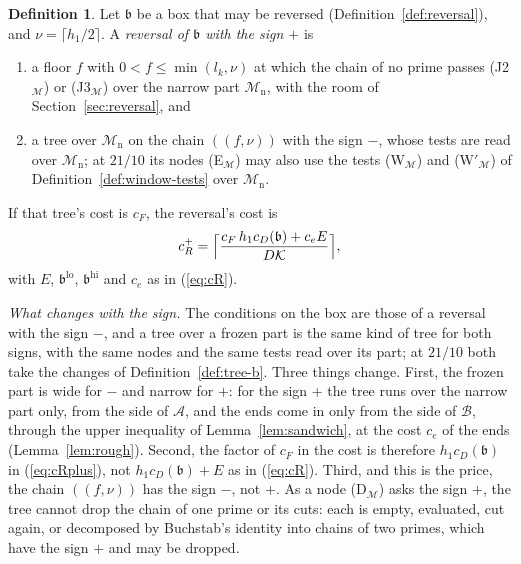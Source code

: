 \documentclass[11pt]{article}
\theoremstyle{definition}
\newtheorem{definition}[theorem]{Definition}
\begin{document}
\begin{definition}\label{def:reversal-plus}
Let $\mathfrak b$ be a box that may be reversed (Definition~\ref{def:reversal}), and $\nu = \lceil h_1/2 \rceil$. A
\emph{reversal of $\mathfrak b$ with the sign $+$} is
\begin{enumerate}
\item[(i)] a floor $f$ with $0 < f \le \min(l_k, \nu)$ at which the chain of no prime passes (J2$_{\mathcal M}$) or
  (J3$_{\mathcal M}$) over the narrow part $\mathcal M_{\mathrm n}$, with the room of Section~\ref{sec:reversal}, and
\item[(ii)] a tree over $\mathcal M_{\mathrm n}$ on the chain $((f, \nu))$ with the sign $-$, whose tests are read
  over $\mathcal M_{\mathrm n}$; at $21/10$ its nodes (E$_{\mathcal M}$) may also use the tests (W$_{\mathcal M}$) and
  (W$'_{\mathcal M}$) of Definition~\ref{def:window-tests} over $\mathcal M_{\mathrm n}$.
\end{enumerate}
If that tree's cost is $c_F$, the reversal's cost is
\begin{equation}\label{eq:cRplus}
  c_R^+ = \Bigl\lceil \frac{c_F\, h_1 c_D(\mathfrak b) + c_e E}{D\mathcal K} \Bigr\rceil,
\end{equation}
with $E$, $\mathfrak b^{\mathrm{lo}}$, $\mathfrak b^{\mathrm{hi}}$ and $c_e$ as in (\ref{eq:cR}).
\end{definition}

\emph{What changes with the sign.} The conditions on the box are those of a reversal with the sign $-$, and a tree over
a frozen part is the same kind of tree for both signs, with the same nodes and the same tests read over its part; at
$21/10$ both take the changes of Definition~\ref{def:tree-b}. Three things change. First, the frozen part is wide for
$-$ and narrow for $+$: for the sign $+$ the tree runs over the narrow part only, from the side of $\mathcal A$, and the
ends come in only from the side of $\mathcal B$, through the upper inequality of Lemma~\ref{lem:sandwich}, at the cost
$c_e$ of the ends (Lemma~\ref{lem:rough}). Second, the factor of $c_F$ in the cost is therefore $h_1 c_D(\mathfrak b)$
in (\ref{eq:cRplus}), not $h_1 c_D(\mathfrak b) + E$ as in (\ref{eq:cR}). Third, and this is the price, the chain
$((f, \nu))$ has the sign $-$, not $+$. As a node (D$_{\mathcal M}$) asks the sign $+$, the tree cannot drop the chain
of one prime or its cuts: each is empty, evaluated, cut again, or decomposed by Buchstab's identity into chains of two
primes, which have the sign $+$ and may be dropped.
\end{document}
